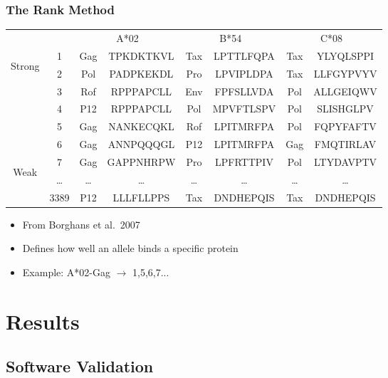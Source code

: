\documentclass[slidescentered,compress]{beamer}
\begin{document}
\frame
{
\frametitle{The Rank Method}

\scriptsize
{
\begin{table}[htp]
\centering
\begin{tabular}{c|c|c|c|c|c|c|c|}

\cline{2-8}
&& \multicolumn{2}{c|}{A*02} & \multicolumn{2}{c|}{B*54} & \multicolumn{2}{c|}{C*08} \bigstrut \\
\cline{2-8}
\multirow{3}{*}{\begin{sideways}Strong\end{sideways}} & 1 & Gag & TPKDKTKVL & Tax & LPTTLFQPA & Tax & YLYQLSPPI  \bigstrut[t] \\
& 2 & Pol & PADPKEKDL & Pro & LPVIPLDPA & Tax & LLFGYPVYV \\
& 3 & Rof & RPPPAPCLL & Env & FPFSLLVDA & Pol & ALLGEIQWV \\
& 4 & P12 & RPPPAPCLL & Pol & MPVFTLSPV & Pol & SLISHGLPV \\
& 5 & Gag & NANKECQKL & Rof & LPITMRFPA & Pol & FQPYFAFTV \\
& 6 & Gag & ANNPQQQGL & P12 & LPITMRFPA & Gag & FMQTIRLAV \\
\multirow{3}{*}{\begin{sideways}Weak\end{sideways}} & 7 & Gag & GAPPNHRPW & Pro & LPFRTTPIV & Pol & LTYDAVPTV \\
& \ldots & \ldots & \ldots & \ldots & \ldots & \ldots & \ldots \\
& 3389 & P12 & LLLFLLPPS & Tax & DNDHEPQIS & Tax & DNDHEPQIS \bigstrut[b] \\
\cline{2-8}

\end{tabular}
\end{table}

}

\pause 

\normalsize
\begin{itemize}
\item From Borghans et al.~2007
\item Defines how well an allele binds a specific protein
\item Example: A*02-Gag $\rightarrow$ 1,5,6,7...
\end{itemize}
}


\section{Results}

\subsection{Software Validation}
\end{document}
